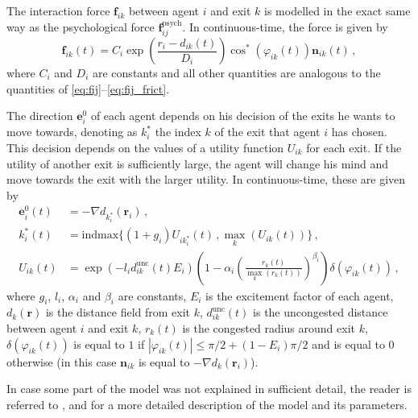 The interaction force $\bm{f}_{ik}$ between agent $i$ and exit $k$ is modelled in the exact same way as the psychological force $\bm{f}_{ij}^{\mathrm{psych}}$. In continuous-time, the force is given by
\begin{equation} \label{eq:fik}
	\bm{f}_{ik}(t) = C_i \exp\left(\frac{r_{i}-d_{ik}(t)}{D_i}\right) \cos^*(\varphi_{ik}(t)) \bm{n}_{ik}(t) \,,
\end{equation}
where $C_i$ and $D_i$ are constants and all other quantities are analogous to the quantities of \eqref{eq:fij}--\eqref{eq:fij_frict}.

The direction $\bm{e}_i^0$ of each agent depends on his decision of the exits he wants to move towards, denoting as $k_i^*$ the index $k$ of the exit that agent $i$ has chosen. This decision depends on the values of a utility function $U_{ik}$ for each exit. If the utility of another exit is sufficiently large, the agent will change his mind and move towards the exit with the larger utility. In continuous-time, these are given by
\begin{subequations}
\begin{align}
	\bm{e}_i^0(t) & = - \nabla d_{k_i^*}(\bm{r}_i) \,, \label{eq:ei} \\
	k_i^*(t) & = \mathrm{indmax}\{ (1+g_i) U_{ik_i^*}(t) \,, \max_k\left(U_{ik}(t)\right) \} \,, \label{eq:ki} \\
	U_{ik}(t) & = \exp\left( -l_i d_{ik}^{\mathrm{unc}}(t) E_i \right) \left(1-\alpha_i\left(\frac{r_k(t)}{\max_k\left(r_k(t)\right)}\right)^{\beta_i}\right) \delta(\varphi_{ik}(t)) \,, \label{eq:Uik}
\end{align}
\end{subequations}
where $g_i$, $l_i$, $\alpha_i$ and $\beta_i$ are constants, $E_i$ is the excitement factor of each agent, $d_k(\bm{r})$ is the distance field from exit $k$, $d_{ik}^{\mathrm{unc}}(t)$ is the uncongested distance between agent $i$ and exit $k$, $r_k(t)$ is the congested radius around exit $k$, $\delta(\varphi_{ik}(t))$ is equal to $1$ if $|\varphi_{ik}(t)| \leq \pi/2 + (1-E_i)\pi/2$ and is equal to $0$ otherwise (in this case $\bm{n}_{ik}$ is equal to $- \nabla d_{k}(\bm{r}_i)$).

In case some part of the model was not explained in sufficient detail, the reader is referred to \cite{Helbing2000}, \cite{Zainuddin2010} and \cite{Wang2016} for a more detailed description of the model and its parameters.

